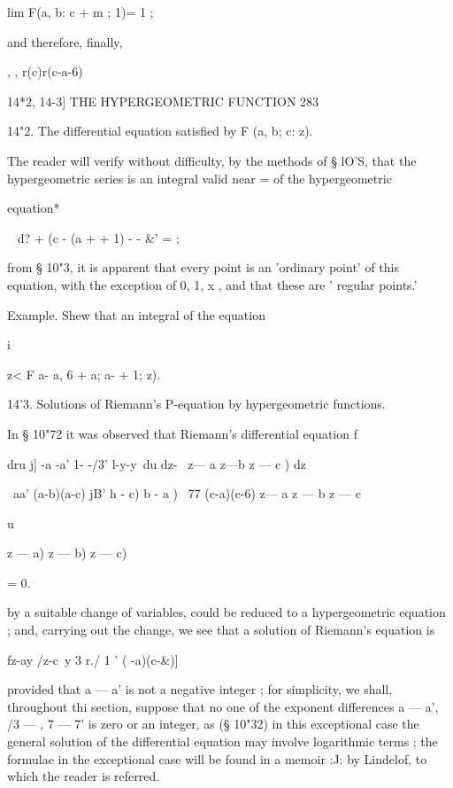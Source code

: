 lim F(a, b: c + m ; 1)= 1 ; 

and therefore, finally, 

   ,  , r(c)r(c-a-6) 



14*2, 14-3] THE HYPERGEOMETRIC FUNCTION 283 

14"2. The differential equation satisfied by F (a, b; c: z). 

The reader will verify without difficulty, by the methods of § lO'S, that 
the hypergeometric series is an integral valid near   = of the hypergeometric 

equation* 

   ~   d? + (c - (a +   + 1)     -  -  \&'  = ; 

from § 10"3, it is apparent that every point is an 'ordinary point' of this 
equation, with the exception of 0, 1, x , and that these are ' regular points.' 

Example. Shew that an integral of the equation 

i  

z< F a- a, 6 + a; a-  + 1; z). 

14'3. Solutions of Riemann's P-equation by hypergeometric functions. 

In § 10"72 it was observed that Riemann's differential equation f 

dru j] -a -a' 1- -/3' l-y-y\ du 
dz- \ z— a z—b z — c ) dz 

\    aa' (a-b)(a-c)  jB'  h - c) b - a ) \   77 (c-a)(c-6) 
z— a z — b z — c 

u 



 z — a)  z — b) z — c) 



= 0. 



by a suitable change of variables, could be reduced to a hypergeometric 
equation ; and, carrying out the change, we see that a solution of Riemann's 
equation is 

fz-ay /z-c\ y    3 r./ 1 ' ( -a)(c-\&)] 

provided that a — a' is not a negative integer ; for simplicity, we shall, 
throughout thi  section, suppose that no one of the exponent differences 
a — a', /3 —  , 7 — 7' is zero or an integer, as (§ 10"32) in this exceptional 
case the general solution of the differential equation may involve logarithmic 
terms ; the formulae in the exceptional case will be found in a memoir :J: by 
Lindelof, to which the reader is referred. 

